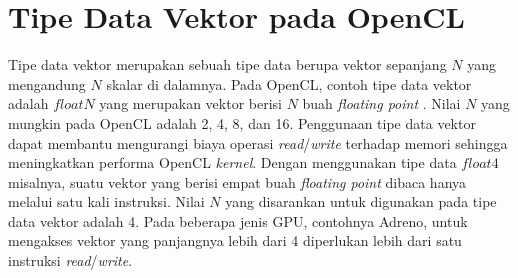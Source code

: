 \section{Tipe Data Vektor pada OpenCL}
Tipe data vektor merupakan sebuah tipe data berupa vektor sepanjang $N$ yang mengandung $N$ skalar di dalamnya. Pada OpenCL, contoh tipe data vektor adalah $floatN$ yang merupakan vektor berisi $N$ buah \textit{floating point} \cite{opencl}. Nilai $N$ yang mungkin pada OpenCL adalah 2, 4, 8, dan 16. Penggunaan tipe data vektor dapat membantu mengurangi biaya operasi \textit{read}/\textit{write} terhadap memori sehingga meningkatkan performa OpenCL \textit{kernel}. Dengan menggunakan tipe data $float4$ misalnya, suatu vektor yang berisi empat buah \textit{floating point} dibaca hanya melalui satu kali instruksi. Nilai $N$ yang disarankan untuk digunakan pada tipe data vektor adalah 4. Pada beberapa jenis GPU, contohnya Adreno, untuk mengakses vektor yang panjangnya lebih dari 4 diperlukan lebih dari satu instruksi \textit{read}/\textit{write}.